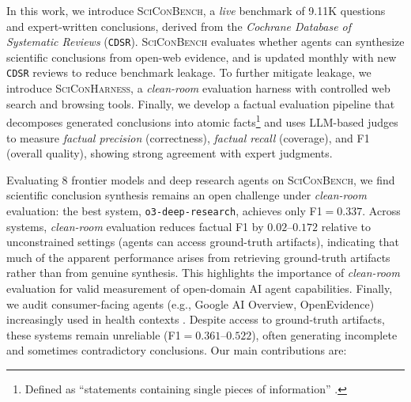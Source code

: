\documentclass{article}
\begin{document}
In this work, we introduce \textsc{SciConBench}, a \textit{live} benchmark of 9.11K questions and expert-written conclusions, derived from the \textit{Cochrane Database of Systematic Reviews} (\texttt{CDSR}). \textsc{SciConBench} evaluates whether agents can synthesize scientific conclusions from open-web evidence, and is updated monthly with new \texttt{CDSR} reviews to reduce benchmark leakage. To further mitigate leakage, we introduce \textsc{SciConHarness}, a \textit{clean-room} evaluation harness with controlled web search and browsing tools.
Finally, we develop a factual evaluation pipeline that decomposes generated conclusions into atomic facts\footnote{Defined as ``statements containing single pieces of information'' \cite{min-etal-2023-factscore, nenkova-passonneau-2004-evaluating}.} and uses LLM-based judges to measure \textit{factual precision} (correctness), \textit{factual recall} (coverage), and F1 (overall quality), showing strong agreement with expert judgments.


Evaluating 8 frontier models and deep research agents on \textsc{SciConBench}, we find scientific conclusion synthesis remains an open challenge under \textit{clean-room} evaluation: the best system, \texttt{o3-deep-research}, achieves only F1$=0.337$. Across systems, \textit{clean-room} evaluation reduces factual F1 by $0.02$--$0.172$ relative to unconstrained settings (agents can access ground-truth artifacts), indicating that much of the apparent performance arises from retrieving ground-truth artifacts rather than from genuine synthesis. This highlights the importance of \textit{clean-room} evaluation for valid measurement of open-domain AI agent capabilities. Finally, we audit consumer-facing agents (e.g., Google AI Overview, OpenEvidence) increasingly used in 
health contexts \cite{annenberg_asaph_2024, openevidence2026million, nytimes_google_ai_health_2024}. Despite access to ground-truth artifacts, these systems remain unreliable (F1$=0.361$--$0.522$), often generating incomplete and sometimes contradictory conclusions. Our main contributions are:
\end{document}
